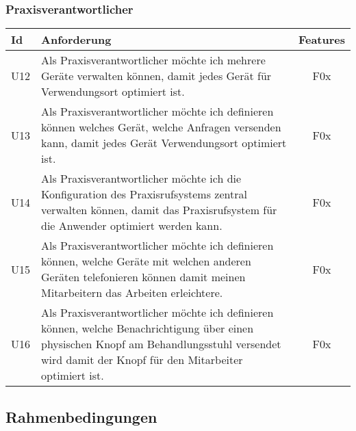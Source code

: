 \subsubsection*{Praxisverantwortlicher}

\begin{table}[h]
    \centering
    \begin{tabular}{|l|p{13cm}|c|}
        \hline
        \textbf{Id} & \textbf{Anforderung}                                                                                                                                                     & \textbf{Features} \\
        \hline
        U12         & Als Praxisverantwortlicher möchte ich mehrere Geräte verwalten können, damit jedes Gerät für Verwendungsort optimiert ist. & F0x \\
        \hline
        U13         & Als Praxisverantwortlicher möchte ich definieren können welches Gerät, welche Anfragen versenden kann, damit jedes Gerät Verwendungsort optimiert ist. & F0x \\
        \hline
        U14         & Als Praxisverantwortlicher möchte ich die Konfiguration des Praxisrufsystems zentral verwalten können, damit das Praxisrufsystem für die Anwender optimiert werden kann. & F0x \\
        \hline
        U15         & Als Praxisverantwortlicher möchte ich definieren können, welche Geräte mit welchen anderen Geräten telefonieren können damit meinen Mitarbeitern das Arbeiten erleichtere. & F0x \\
        \hline
        U16         & Als Praxisverantwortlicher möchte ich definieren können, welche Benachrichtigung über einen physischen Knopf am Behandlungsstuhl versendet wird damit der Knopf für den Mitarbeiter optimiert ist. & F0x \\
        \hline
    \end{tabular}\label{tab:userstories2}
\end{table}


\clearpage

\subsection{Rahmenbedingungen}\label{subsec:rahmenbedingungen}

